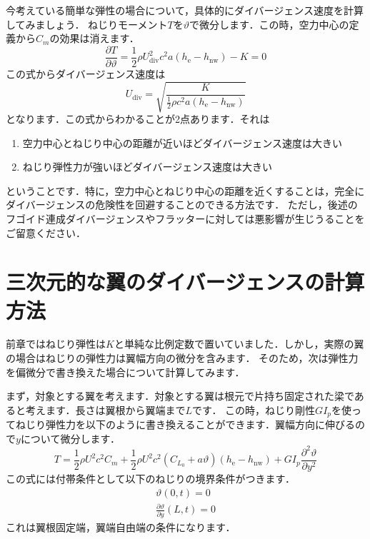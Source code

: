 \documentclass{jarticle}
\begin{document}
今考えている簡単な弾性の場合について，具体的にダイバージェンス速度を計算してみましょう．
ねじりモーメント$T$を$\vartheta$で微分します．この時，空力中心の定義から$C_m$の効果は消えます．
\begin{equation}\label{Tv}
    \frac{\partial T}{\partial \vartheta} = \frac{1}{2}\rho U_\mathrm{div}^2 c^2 a  (h_\mathrm{e}-h_\mathrm{nw}) - K = 0
\end{equation}
この式からダイバージェンス速度は
\begin{equation}
    U_\mathrm{div} = \sqrt{\frac{K}{\frac{1}{2}\rho c^2 a  (h_\mathrm{e}-h_\mathrm{nw})}}
\end{equation}
となります．この式からわかることが2点あります．それは
\begin{enumerate}
    \item 空力中心とねじり中心の距離が近いほどダイバージェンス速度は大きい
    \item ねじり弾性力が強いほどダイバージェンス速度は大きい
\end{enumerate}
ということです．特に，空力中心とねじり中心の距離を近くすることは，完全にダイバージェンスの危険性を回避することのできる方法です．
ただし，後述のフゴイド連成ダイバージェンスやフラッターに対しては悪影響が生じうることをご留意ください．

\section{三次元的な翼のダイバージェンスの計算方法}

前章ではねじり弾性は$K$と単純な比例定数で置いていました．しかし，実際の翼の場合はねじりの弾性力は翼幅方向の微分を含みます．
そのため，次は弾性力を偏微分で書き換えた場合について計算してみます．

まず，対象とする翼を考えます．対象とする翼は根元で片持ち固定された梁であると考えます．長さは翼根から翼端まで$L$です．
この時，ねじり剛性$GI_p$を使ってねじり弾性力を以下のように書き換えることができます．翼幅方向に伸びるので$y$について微分します．
\begin{equation} \label{gip}
    T = \frac{1}{2}\rho U^2 c^2 C_m + \frac{1}{2}\rho U^2 c^2 (C_{L_0} + a\vartheta)  (h_\mathrm{e}-h_\mathrm{nw}) + GI_p \frac{\partial^2 \vartheta}{\partial y^2}
\end{equation}
この式には付帯条件として以下のねじりの境界条件がつきます．
\begin{align}
    \vartheta(0,t) = 0 \\
    \frac{\partial \vartheta}{\partial y}(L,t) = 0
\end{align}
これは翼根固定端，翼端自由端の条件になります．
\end{document}
